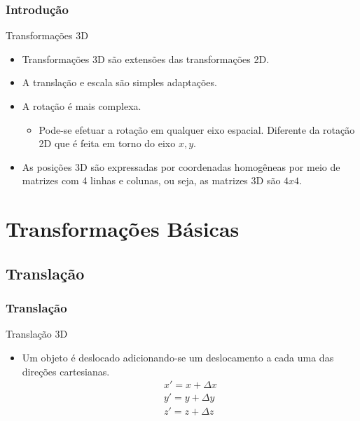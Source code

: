 \documentclass{beamer}
\begin{document}
\begin{frame}
\frametitle{Introdução}


	\begin{block}{Transformações 3D}
		\begin{itemize}
			\item<1-> Transformações 3D são extensões das transformações 2D.
			\item<2-> A translação e escala são simples adaptações.
			\item<3-> A rotação é mais complexa.
				\begin{itemize}
					\item Pode-se efetuar a rotação em qualquer eixo espacial. Diferente da rotação 2D que é feita em torno do eixo $x,y$.
				\end{itemize}
			\item<4-> As posições 3D são expressadas por coordenadas homogêneas por meio de matrizes com 4 linhas e colunas, ou seja, as matrizes 3D são $4x4$.
		\end{itemize}
	\end{block}
	
\end{frame}


\section{Transformações Básicas}
\subsection{Translação}
\begin{frame}
\frametitle{Translação}


	\begin{block}{Translação 3D}
		\begin{itemize}
			\item Um objeto é deslocado adicionando-se um deslocamento a cada uma das direções cartesianas.
			\begin{eqnarray*}
				x' = x + \Delta x \\
				y' = y + \Delta y \\
				z' = z + \Delta z \\
			\end{eqnarray*}
		\end{itemize}
	\end{block}
	
\end{frame}
\end{document}
